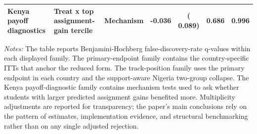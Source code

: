 \begin{table}[!htbp]
\begin{threeparttable}
\begin{tabular}[t]{p{3.1cm}p{4.8cm}p{1.8cm}cccc}
Kenya payoff diagnostics & Treat x top assignment-gain tercile & Mechanism &  -0.036 & (  0.089) & 0.686 & 0.996 \\
\bottomrule
\end{tabular}
\begin{tablenotes}
\footnotesize
\item \textit{Notes:} The table reports Benjamini-Hochberg false-discovery-rate q-values within each displayed family. The primary-endpoint family contains the country-specific ITTs that anchor the reduced form. The track-position family uses the primary endpoint in each country and the support-aware Nigeria two-group collapse. The Kenya payoff-diagnostic family contains mechanism tests used to ask whether students with larger predicted assignment gains benefited more. Multiplicity adjustments are reported for transparency; the paper's main conclusions rely on the pattern of estimates, implementation evidence, and structural benchmarking rather than on any single adjusted rejection.
\end{tablenotes}
\end{threeparttable}
\end{table}
